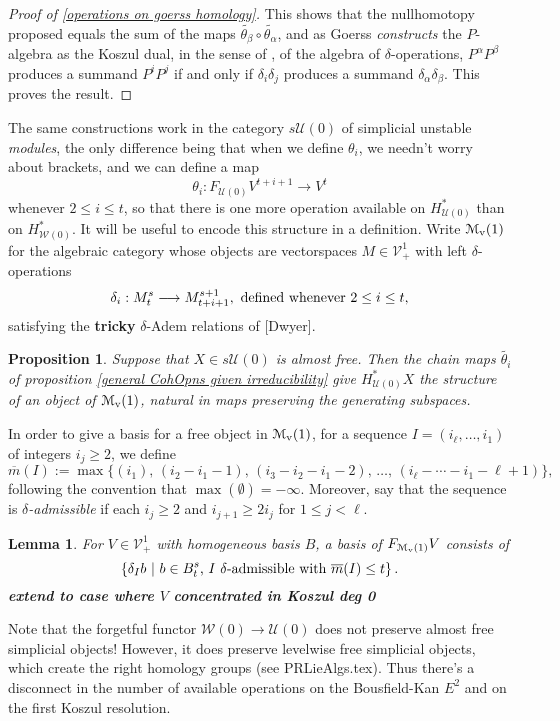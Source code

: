 \documentclass[11pt]{amsart}
\theoremstyle{plain}
\newtheorem{lem}[thm]{Lemma}
\newtheorem{prop}[thm]{Proposition}
\theoremstyle{definition}
\renewcommand{\to}{\longrightarrow}
\newcommand{\calW}{\mathcal{W}}
\newcommand{\calU}{\mathcal{U}}
\newcommand{\calV}{\mathcal{V}}
\newcommand{\calMv}{\mathcal{M}_\textup{v}}
\theoremstyle{plain}
\newcommand{\vect}[2]{\calV^{#1}_{#2}}
\newcommand{\minDimP}{\overline{m}}
\begin{document}
\begin{Cohomology Operations for W and U}
\begin{proof}[Proof of \ref{operations on goerss homology}]
This shows that the nullhomotopy proposed equals the sum of the maps $\widetilde{\theta_\beta}\circ\widetilde{\theta_\alpha}$, and as Goerss \cite{MR1089001} \emph{constructs} the $P$-algebra as the Koszul dual, in the sense of \cite{PriddyKoszul.pdf}, of the algebra of $\delta$-operations, $P^{\alpha }P^{\beta}$ produces a summand $P^iP^j$ if and only if $\delta_i\delta_j$ produces a summand $\delta_{\alpha }\delta_{\beta}$. This proves the result.
\end{proof}
The same constructions work in the category $s\calU(0)$ of simplicial unstable \emph{modules}, the only difference being that when we define $\theta_i$, we needn't worry about brackets, and we can define a map
\[\theta_i:F_{\calU(0)}V^{t+i+1}\to V^t\]
whenever $2\leq i\leq t$, so that there is one more operation available on $H^*_{\calU(0)}$ than on $H^*_{\calW(0)}$. It will be useful to encode this structure in a definition. Write $\calMv(1)$ for the algebraic category whose objects are vectorspaces $M\in\vect{1}{+}$ with left $\delta$-operations
\[\delta_i:M^{s}_t\to M^{s+1}_{t+i+1},\textup{ defined whenever $2\leq i\leq t$,}\]
satisfying the \textbf{tricky} $\delta$-Adem relations of [Dwyer].
\begin{prop}\label{operations on untable P homology}
Suppose that $X\in s\calU(0)$ is almost free. Then the chain maps $\widetilde{\theta_i}$ of proposition \ref{general CohOpns given irreducibility} give $H^*_{\calU(0)}X$ the structure of an object of $\calMv(1)$, natural in maps preserving the generating subspaces.
\end{prop}
In order to give a basis for a free object in $\calMv(1)$, for a sequence $I=(i_\ell,\ldots,i_1)$ of integers $i_j\geq2$, we define
\[\minDimP(I):=\max\{(i_1),\,(i_2-i_1-1),\,(i_3-i_2-i_1-2),\,\ldots,\,(i_{\ell}-\cdots-i_1-\ell+1)\},
\]
following the convention that $\max(\emptyset)=-\infty$. Moreover, say that the sequence is \emph{$\delta$-admissible} if each $i_j\geq2$ and  $i_{j+1}\geq 2i_j$ for $1\leq j <\ell$.
\begin{lem}\label{basis of element of M(0)}
For $V\in\vect{1}{+}$ with homogeneous basis $B$, a basis of $F_{\calMv(1)}V$ consists of
\[\left\{\delta_Ib\ \middle|\ b\in B^{s}_t\textup{, $I$ $\delta$-admissible with }\minDimP(I)\leq t\right\}.\]
\textbf{extend to case where $V$ concentrated in Koszul deg 0}\end{lem}
\begin{shaded}
Note that the forgetful functor $\calW(0)\to\calU(0)$ does not preserve almost free simplicial objects! However, it does preserve levelwise free simplicial objects, which create the right homology groups (see PRLieAlgs.tex). Thus there's a disconnect in the number of available operations on the Bousfield-Kan $E^2$ and on the first Koszul resolution.
\end{shaded}


\end{Cohomology Operations for W and U}
\end{document}
